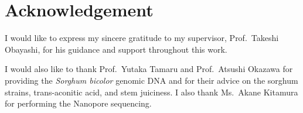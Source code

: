 \chapter*{Acknowledgement}

\hspace{1em}I would like to express my sincere gratitude to my supervisor, Prof.\ Takeshi Obayashi, for his guidance and support throughout this work.

\hspace{1em}I would also like to thank Prof.\ Yutaka Tamaru and Prof.\ Atsushi Okazawa for providing the \textit{Sorghum bicolor} genomic DNA and for their advice on the sorghum strains, trans-aconitic acid, and stem juiciness. I also thank Ms.\ Akane Kitamura for performing the Nanopore sequencing.
